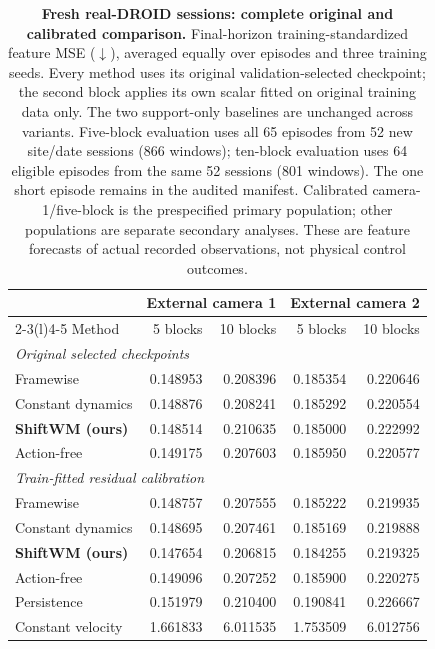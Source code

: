 \begin{table}[t]\centering\small
\setlength{\tabcolsep}{4pt}\renewcommand{\arraystretch}{1.10}
\begin{tabular}{lrrrr}\toprule
& \multicolumn{2}{c}{External camera 1} & \multicolumn{2}{c}{External camera 2}\\
\cmidrule(lr){2-3}\cmidrule(l){4-5}
Method & 5 blocks & 10 blocks & 5 blocks & 10 blocks\\\midrule
\multicolumn{5}{l}{\emph{Original selected checkpoints}}\\
Framewise & 0.148953 & 0.208396 & 0.185354 & 0.220646\\
Constant dynamics & 0.148876 & 0.208241 & 0.185292 & 0.220554\\
\rowcolor{orange!9}
\textbf{ShiftWM (ours)} & 0.148514 & 0.210635 & 0.185000 & 0.222992\\
Action-free & 0.149175 & 0.207603 & 0.185950 & 0.220577\\
\midrule
\multicolumn{5}{l}{\emph{Train-fitted residual calibration}}\\
Framewise & 0.148757 & 0.207555 & 0.185222 & 0.219935\\
Constant dynamics & 0.148695 & 0.207461 & 0.185169 & 0.219888\\
\rowcolor{orange!9}
\textbf{ShiftWM (ours)} & 0.147654 & 0.206815 & 0.184255 & 0.219325\\
Action-free & 0.149096 & 0.207252 & 0.185900 & 0.220275\\
\midrule
Persistence & 0.151979 & 0.210400 & 0.190841 & 0.226667\\
Constant velocity & 1.661833 & 6.011535 & 1.753509 & 6.012756\\
\bottomrule\end{tabular}
\caption{\textbf{Fresh real-DROID sessions: complete original and calibrated comparison.} Final-horizon training-standardized feature MSE ($\downarrow$), averaged equally over episodes and three training seeds. Every method uses its original validation-selected checkpoint; the second block applies its own scalar fitted on original training data only. The two support-only baselines are unchanged across variants. Five-block evaluation uses all 65 episodes from 52 new site/date sessions (866 windows); ten-block evaluation uses 64 eligible episodes from the same 52 sessions (801 windows). The one short episode remains in the audited manifest. Calibrated camera-1/five-block is the prespecified primary population; other populations are separate secondary analyses. These are feature forecasts of actual recorded observations, not physical control outcomes.}
\label{tab:fresh-real-video-complete}\end{table}
